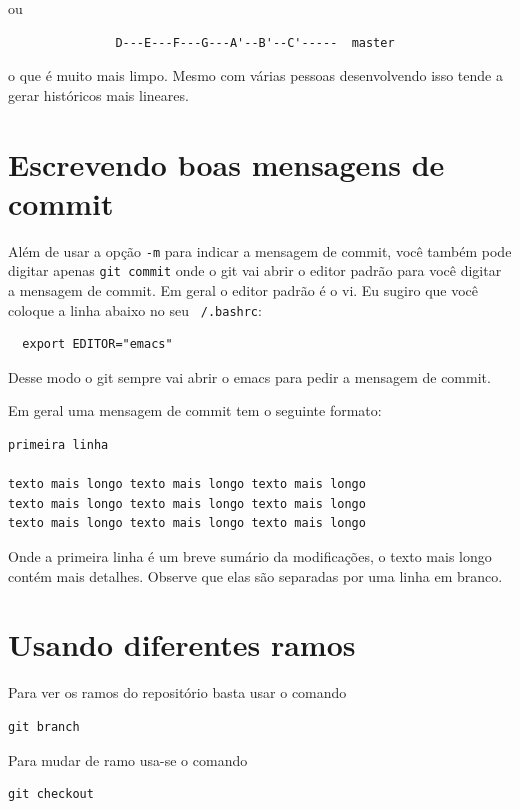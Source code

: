 \documentclass[12pt,brazil]{book}
\begin{document}
ou

\begin{verbatim}
               D---E---F---G---A'--B'--C'-----  master
\end{verbatim}

o que é muito mais limpo. Mesmo com várias pessoas desenvolvendo isso
tende a gerar históricos mais lineares.

\section{Escrevendo boas mensagens de commit}
\label{sec:escr-boas-mens}

Além de usar a opção \texttt{-m} para indicar a mensagem de commit,
você também pode digitar apenas \texttt{git commit} onde o git vai
abrir o editor padrão para você digitar a mensagem de commit. Em geral
o editor padrão é o vi. Eu sugiro que você coloque a linha abaixo no
seu \texttt{~/.bashrc}:

\begin{verbatim}
  export EDITOR="emacs"
\end{verbatim}

Desse modo o git sempre vai abrir o emacs para pedir a mensagem de
commit.

Em geral uma mensagem de commit tem o seguinte formato:

\begin{verbatim}
primeira linha

texto mais longo texto mais longo texto mais longo
texto mais longo texto mais longo texto mais longo
texto mais longo texto mais longo texto mais longo 
\end{verbatim}

Onde a primeira linha é um breve sumário da modificações, o texto mais
longo contém mais detalhes. Observe que elas são separadas por uma
linha em branco.

\section{Usando diferentes ramos}
\label{sec:usando-o-git}

Para ver os ramos do repositório basta usar o comando

\begin{verbatim}
git branch
\end{verbatim}

Para mudar de ramo usa-se o comando

\begin{verbatim}
git checkout
\end{verbatim}
\end{document}
